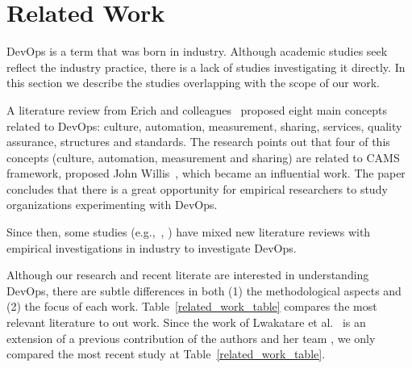 \section{Related Work} \label{sec:related_work}

DevOps is a term that was born in industry. Although academic studies seek
reflect the industry practice, there is a lack of studies investigating it
directly. In this section we describe the studies overlapping with the scope of our work.

A literature review from Erich and colleagues~\cite{cooperation_dev_ops_esem_2014} proposed eight
main concepts related to DevOps: culture, automation, measurement, sharing,
services, quality assurance, structures and standards. The research points out
that four of this concepts (culture, automation, measurement and sharing) are
related to CAMS framework, proposed John Willis~\cite{what_devops_means_2010}, which
became an influential work. The paper concludes that there is a great
opportunity for empirical researchers to study organizations experimenting with
DevOps.

Since then, some studies (e.g.,~\cite{devops_a_definition_xp_15,dimensions_of_devops_xp_15,extending_dimensions_icsea_16},
\cite{characterizing_devops_sbes_2016,qualitative_devops_journalsw_17}) have mixed new literature reviews
with empirical investigations in industry to investigate DevOps.

Although our research and recent literate are interested in understanding DevOps,
there are subtle differences in both (1) the methodological aspects and (2) the focus
of each work. Table~\ref{related_work_table} compares the most relevant literature to
out work. Since the work of Lwakatare et al.~\cite{extending_dimensions_icsea_16} is an
extension of a previous contribution of the authors and her team \cite{dimensions_of_devops_xp_15},
we only compared the most recent study at Table~\ref{related_work_table}.

